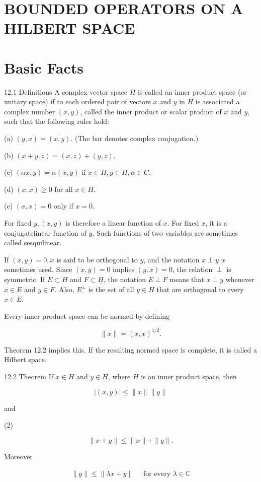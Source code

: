 \documentclass[10pt]{article}
\begin{document}
\section{BOUNDED OPERATORS ON A HILBERT SPACE}
\section{Basic Facts}
12.1 Definitions A complex vector space $H$ is called an inner product space (or unitary space) if to each ordered pair of vectors $x$ and $y$ in $H$ is associated a complex number $(x, y)$, called the inner product or scalar product of $x$ and $y$, such that the following rules hold:

(a) $(y, x)=\overline{(x, y)}$. (The bar denotes complex conjugation.)

(b) $(x+y, z)=(x, z)+(y, z)$.

(c) $(\alpha x, y)=\alpha(x, y)$ if $x \in H, y \in H, \alpha \in C$.

(d) $(x, x) \geq 0$ for all $x \in H$.

(e) $(x, x)=0$ only if $x=0$.

For fixed $y,(x, y)$ is therefore a linear function of $x$. For fixed $x$, it is a conjugatelinear function of $y$. Such functions of two variables are sometimes called sesquilinear.

If $(x, y)=0, x$ is said to be orthogonal to $y$, and the notation $x \perp y$ is sometimes used. Since $(x, y)=0$ implies $(y, x)=0$, the relation $\perp$ is symmetric. If $E \subset H$ and $F \subset \underline{H}$, the notation $E \perp F$ means that $x \perp y$ whenever $x \in E$ and $y \in F$. Also, $E^{\perp}$ is the set of all $y \in H$ that are orthogonal to every $x \in E$.

Every inner product space can be normed by defining

$$
\|x\|=(x, x)^{1 / 2} .
$$

Theorem 12.2 implies this. If the resulting normed space is complete, it is called a Hilbert space.

12.2 Theorem If $x \in H$ and $y \in H$, where $H$ is an inner product space, then

$$
|(x, y)| \leq\|x\|\|y\|
$$

and

(2)

$$
\|x+y\| \leq\|x\|+\|y\| .
$$

Moreover

$$
\|y\| \leq\|\dot{\lambda} x+y\| \quad \text { for every } \lambda \in \mathbb{C}
$$
\end{document}
